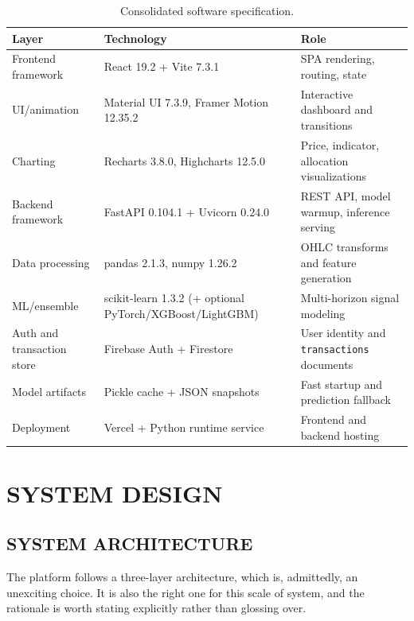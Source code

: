 \documentclass[12pt,a4paper]{report}
\numberwithin{equation}{chapter}
\begin{document}
\begin{table}[H]
\centering
\caption{Consolidated software specification.}
\label{tab:software}
\small
\begin{tabular}{|p{3.8cm}|p{4.2cm}|p{5cm}|}
\hline
\textbf{Layer} & \textbf{Technology} & \textbf{Role} \\ \hline
Frontend framework & React 19.2 + Vite 7.3.1 & SPA rendering, routing, state \\ \hline
UI/animation & Material UI 7.3.9, Framer Motion 12.35.2 & Interactive dashboard and transitions \\ \hline
Charting & Recharts 3.8.0, Highcharts 12.5.0 & Price, indicator, allocation visualizations \\ \hline
Backend framework & FastAPI 0.104.1 + Uvicorn 0.24.0 & REST API, model warmup, inference serving \\ \hline
Data processing & pandas 2.1.3, numpy 1.26.2 & OHLC transforms and feature generation \\ \hline
ML/ensemble & scikit-learn 1.3.2 (+ optional PyTorch/XGBoost/LightGBM) & Multi-horizon signal modeling \\ \hline
Auth and transaction store & Firebase Auth + Firestore & User identity and \texttt{transactions} documents \\ \hline
Model artifacts & Pickle cache + JSON snapshots & Fast startup and prediction fallback \\ \hline
Deployment & Vercel + Python runtime service & Frontend and backend hosting \\ \hline
\end{tabular}
\end{table}

\chapter{SYSTEM DESIGN}

\section{SYSTEM ARCHITECTURE}

The platform follows a three-layer architecture, which is, admittedly, an unexciting choice. It is also the right one for this scale of system, and the rationale is worth stating explicitly rather than glossing over.
\end{document}
